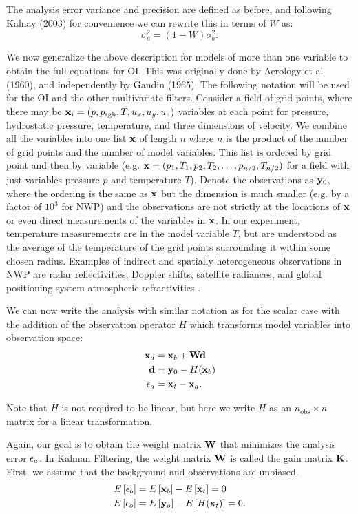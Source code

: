 \documentclass[12pt]{report}
\begin{document}
The analysis error variance and precision are defined as before, and following Kalnay (2003) for convenience we can rewrite this in terms of $W$ as:
\begin{equation} \sigma _a ^2 = (1-W ) \sigma_b^2 .\end{equation}

We now generalize the above description for models of more than one variable to obtain the full equations for OI.
This was originally done by Aerology et al (1960), and independently by Gandin (1965). The following notation will be used for the OI and the other multivariate filters.
Consider a field of grid points, where there may be $\mathbf{x}_i = (p,p_{\text{rgh}},T,u_x,u_y,u_z)$ variables at each point for pressure, hydrostatic pressure, temperature, and three dimensions of velocity.
We combine all the variables into one list $\mathbf{x}$ of length $n$ where $n$ is the product of the number of grid points and the number of model variables.
This list is ordered by grid point and then by variable (e.g. $\mathbf{x} = (p_1,T_1,p_2,T_2,\ldots,p_{n/2},T_{n/2})$ for a field with just variables pressure $p$ and temperature $T$).
Denote the observations as $\mathbf{y}_0$, where the ordering is the same as $\mathbf{x}$ but the dimension is much smaller (e.g. by a factor of $10^3$ for NWP) and the observations are not strictly at the locations of $\mathbf{x}$ or even direct measurements of the variables in $\mathbf{x}$.
In our experiment, temperature measurements are in the model variable $T$, but are understood as the average of the temperature of the grid points surrounding it within some chosen radius.
Examples of indirect and spatially heterogeneous observations in NWP are radar reflectivities, Doppler shifts, satellite radiances, and global positioning system atmospheric refractivities .

We can now write the analysis with similar notation as for the scalar case with the addition of the observation operator $H$ which transforms model variables into observation space:
\begin{align} \mathbf{x}_a &= \mathbf{x}_b + \mathbf{W} \mathbf{d} \\
\mathbf{d} &=  \mathbf{y}_0 - H (\mathbf{x} _b ) \\
\mathbf{\epsilon} _a  &= \mathbf{x}_t - \mathbf{x}_a . \end{align}

Note that $H$ is not required to be linear, but here we write $H$ as an $n_{\text{obs}} \times n$ matrix for a linear transformation.

Again, our goal is to obtain the weight matrix $\mathbf{W}$ that minimizes the analysis error $\mathbf{\epsilon}_a$. In Kalman Filtering, the weight matrix $\mathbf{W}$ is called the gain matrix $\mathbf{K}$.
First, we assume that the background and observations are unbiased.
\begin{align*} E \left [  \mathbf{\epsilon}_b \right ] &= E \left [  \mathbf{x} _b \right ] - E \left [ \mathbf{x} _t  \right ] = 0\\
E \left [  \mathbf{\epsilon}_o  \right ]  &= E \left [  \mathbf{y}_o  \right ] - E \left [  H(\mathbf{x}_t) \right ] = 0 .\end{align*}
\end{document}

